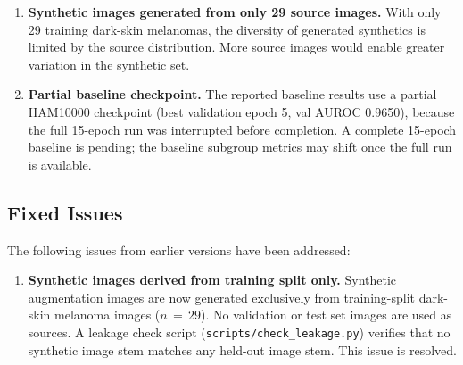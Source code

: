 \begin{enumerate}
    \item \textbf{Synthetic images generated from only 29 source images.} With only 29 training dark-skin melanomas, the diversity of generated synthetics is limited by the source distribution. More source images would enable greater variation in the synthetic set.

    \item \textbf{Partial baseline checkpoint.} The reported baseline results use a partial HAM10000 checkpoint (best validation epoch 5, val AUROC 0.9650), because the full 15-epoch run was interrupted before completion. A complete 15-epoch baseline is pending; the baseline subgroup metrics may shift once the full run is available.
\end{enumerate}

\subsection{Fixed Issues}

The following issues from earlier versions have been addressed:

\begin{enumerate}
    \item \textbf{Synthetic images derived from training split only.} Synthetic augmentation images are now generated exclusively from training-split dark-skin melanoma images ($n\,{=}\,29$). No validation or test set images are used as sources. A leakage check script (\texttt{scripts/check\_leakage.py}) verifies that no synthetic image stem matches any held-out image stem. This issue is resolved.
\end{enumerate}
